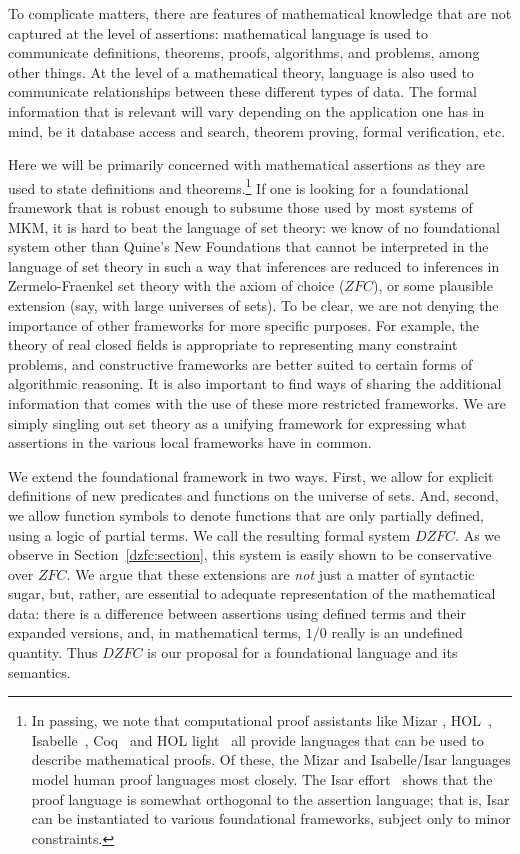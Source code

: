 \documentclass{llncs}
\newcommand{\na}[1]{\mathit{#1}}    \newcommand{\fn}[1]{\mathit{#1}}    \newcommand{\ax}[1]{\mathit{(#1)}}  \newcommand{\mdl}[1]{\mathcal{#1}}
\begin{document}
To complicate matters, there are features of mathematical knowledge
that are not captured at the level of assertions: mathematical
language is used to communicate definitions, theorems, proofs,
algorithms, and problems, among other things. At the level of a
mathematical theory, language is also used to communicate
relationships between these different types of data. The formal
information that is relevant will vary depending on the application
one has in mind, be it database access and search, theorem proving,
formal verification, etc.

Here we will be primarily concerned with mathematical assertions as
they are used to state definitions and theorems.\footnote{In passing,
  we note that computational proof assistants like Mizar
  \cite{rudniki:92}, HOL~\cite{gordon:melham:93},
  Isabelle~\cite{nipkow:et:al:02}, Coq~\cite{bertot:casteran:04} and
  HOL light~\cite{harrison:96} all provide languages that can be used
  to describe mathematical proofs. Of these, the Mizar and
  Isabelle/Isar languages model human proof languages most closely.
  The Isar effort~\cite{wenzel:07} shows that the proof language is
  somewhat orthogonal to the assertion language; that is, Isar can be
  instantiated to various foundational frameworks, subject only to
  minor constraints.} If one is looking for a foundational
framework that is robust enough to subsume those used by most systems
of MKM, it is hard to beat the language of set theory: we know of no
foundational system other than Quine's New Foundations that cannot be
interpreted in the language of set theory in such a way that
inferences are reduced to inferences in Zermelo-Fraenkel set theory
with the axiom of choice ($\na{ZFC}$), or some plausible extension
(say, with large universes of sets). To be clear, we are not denying
the importance of other frameworks for more specific purposes.  For
example, the theory of real closed fields is appropriate to
representing many constraint problems, and constructive frameworks are
better suited to certain forms of algorithmic reasoning. It is also
important to find ways of sharing the additional information that
comes with the use of these more restricted frameworks. We are simply
singling out set theory as a unifying framework for expressing what
assertions in the various local frameworks have in common.

We extend the foundational framework in two ways. First, we allow for
explicit definitions of new predicates and functions on the universe
of sets. And, second, we allow function symbols to denote functions
that are only partially defined, using a logic of partial terms. We
call the resulting formal system $\na{DZFC}$. As we observe in
Section~\ref{dzfc:section}, this system is easily shown to be
conservative over $\na{ZFC}$.  We argue that these extensions are
\emph{not} just a matter of syntactic sugar, but, rather, are
essential to adequate representation of the mathematical data: there
is a difference between assertions using defined terms and their
expanded versions, and, in mathematical terms, $1/0$ really is an
undefined quantity. Thus $\na{DZFC}$ is our proposal for a
foundational language and its semantics.
\end{document}
